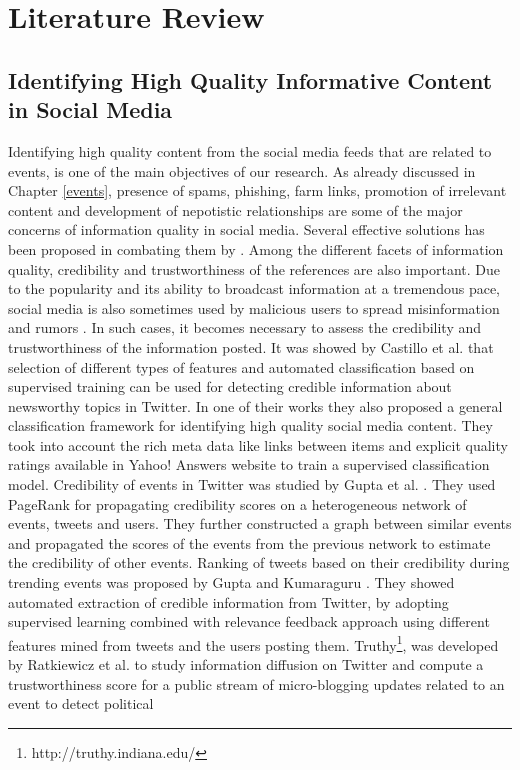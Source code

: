 
\chapter{Literature Review} %

\label{review} %


\section{Identifying High Quality Informative Content in Social Media}
Identifying high quality content from the social media feeds that are related to events, is one of the main objectives of our research. As already discussed in Chapter \ref{events}, presence of spams, phishing, farm links, promotion of irrelevant content and development of nepotistic relationships are some of the major concerns of information quality in social media. Several effective solutions has been proposed in combating them by \cite{benevenuto2010detecting,chhabra2011phi,grier2010spam,yardi2009detecting}. Among the different facets of information quality, credibility and trustworthiness of the references are also important.  Due to the popularity and its ability to broadcast information at a tremendous pace, social media is also sometimes used by malicious users to spread misinformation and rumors \cite{tonkin2012twitter}. In such cases, it becomes necessary to assess the credibility and trustworthiness of the information posted. It was showed by Castillo et al. \cite{castillo2011information} that selection of different types of features and automated classification based on supervised training can be used for detecting credible information about newsworthy topics in Twitter. In one of their works \cite{agichtein2008finding} they also proposed a general classification framework for identifying high quality social media content. They took into account the rich meta data like links between items and explicit quality ratings available in Yahoo! Answers website to train a supervised classification model. Credibility of events in Twitter was studied by Gupta et al. \cite{gupta2012evaluating}. They used PageRank for propagating credibility scores on a heterogeneous network of events, tweets and users. They further constructed a graph between similar events and propagated the scores of the events from the previous network to estimate the credibility of other events. Ranking of tweets based on their credibility during trending events was proposed by Gupta and Kumaraguru \cite{gupta2012credibility}. They showed automated extraction of credible information from Twitter, by adopting supervised learning combined with relevance feedback approach using different features mined from tweets and the users posting them. Truthy\footnote{http://truthy.indiana.edu/}, was developed by Ratkiewicz et al. to study information diffusion on Twitter and compute a trustworthiness score for a public stream of micro-blogging updates related to an event to detect political 